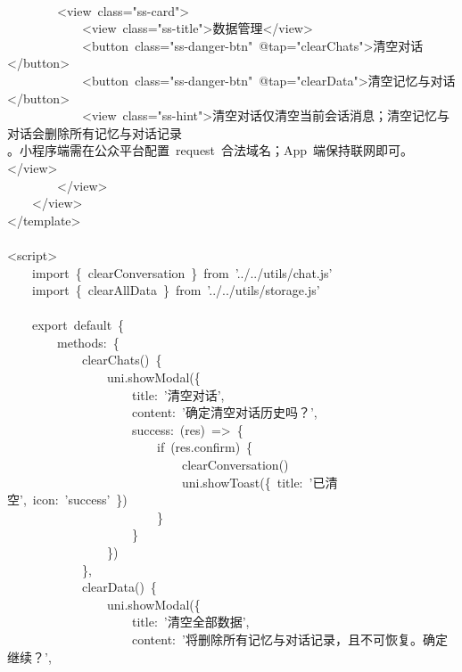 \documentclass[a4paper,10pt]{article}
\begin{document}
{\ttfamily\footnotesize\raggedright
\mbox{}\\
~~~~~~~~<view~class="ss-card">\\
~~~~~~~~~~~~<view~class="ss-title">数据管理</view>\\
~~~~~~~~~~~~<button~class="ss-danger-btn"~@tap="clearChats">清空对话</button>\\
~~~~~~~~~~~~<button~class="ss-danger-btn"~@tap="clearData">清空记忆与对话</button>\\
~~~~~~~~~~~~<view~class="ss-hint">清空对话仅清空当前会话消息；清空记忆与对话会删除所有记忆与对话记录\\
。小程序端需在公众平台配置~request~合法域名；App~端保持联网即可。</view>\\
~~~~~~~~</view>\\
~~~~</view>\\
</template>\\
\mbox{}\\
<script>\\
~~~~import~\{~clearConversation~\}~from~'../../utils/chat.js'\\
~~~~import~\{~clearAllData~\}~from~'../../utils/storage.js'\\
\mbox{}\\
~~~~export~default~\{\\
~~~~~~~~methods:~\{\\
~~~~~~~~~~~~clearChats()~\{\\
~~~~~~~~~~~~~~~~uni.showModal(\{\\
~~~~~~~~~~~~~~~~~~~~title:~'清空对话',\\
~~~~~~~~~~~~~~~~~~~~content:~'确定清空对话历史吗？',\\
~~~~~~~~~~~~~~~~~~~~success:~(res)~=>~\{\\
~~~~~~~~~~~~~~~~~~~~~~~~if~(res.confirm)~\{\\
~~~~~~~~~~~~~~~~~~~~~~~~~~~~clearConversation()\\
~~~~~~~~~~~~~~~~~~~~~~~~~~~~uni.showToast(\{~title:~'已清空',~icon:~'success'~\})\\
~~~~~~~~~~~~~~~~~~~~~~~~\}\\
~~~~~~~~~~~~~~~~~~~~\}\\
~~~~~~~~~~~~~~~~\})\\
~~~~~~~~~~~~\},\\
~~~~~~~~~~~~clearData()~\{\\
~~~~~~~~~~~~~~~~uni.showModal(\{\\
~~~~~~~~~~~~~~~~~~~~title:~'清空全部数据',\\
~~~~~~~~~~~~~~~~~~~~content:~'将删除所有记忆与对话记录，且不可恢复。确定继续？',\\
}
\end{document}
